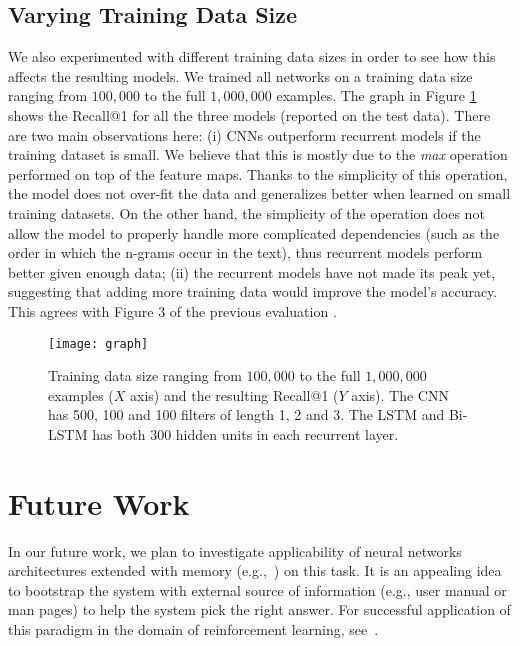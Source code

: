 \documentclass{article} \usepackage{nips15submit_e,times}
\newcommand{\MARTINSECOND}[1]{{\color{black}#1}} \newcommand{\MARTINTHIRD}[1]{{\color{black}#1}} \newcommand{\COPY}[1]{{\color{black}[#1]}}
\begin{document}
\subsection{Varying Training Data Size}
\MARTINSECOND{
We also experimented with different training data sizes in order to see how this affects the resulting models.
We trained all networks on a training data size ranging from $100,000$ to the full $1,000,000$ examples.
The graph in Figure \ref{fig-graph} shows the Recall@1 for all the three models (reported on the test data).
There are two main observations here: 
(i) CNNs outperform recurrent models if the training dataset is small.
We believe that this is mostly due to the \textit{max} operation performed on top of the feature maps.
Thanks to the simplicity of this operation, the model does not over-fit the data and generalizes better when learned on small training datasets.
On the other hand, the simplicity of the operation does not allow the model to properly handle more complicated dependencies 
(such as the order in which the n-grams occur in the text), thus recurrent models perform better given enough data;
(ii) the recurrent models have not made its peak yet, suggesting that adding more training data would improve the model's accuracy.
This agrees with Figure 3 of the previous evaluation \cite{lowe2015ubuntu}.
}

\begin{figure}[h!]
  \centering
  \texttt{[image: graph]}
  \caption   
  {
  Training data size ranging from $100,000$ to the full $1,000,000$ examples ($X$ axis) and the resulting
  Recall@1 ($Y$ axis). The CNN has 500, 100 and 100 filters of length 1, 2 and 3. The LSTM and Bi-LSTM has both 300 hidden units in each recurrent layer.
  }
  \label{fig-graph}
\end{figure}








\section{Future Work}
In our future work, we plan to investigate applicability of neural networks architectures extended with memory (e.g.,~\cite{Graves2014,Sukhbaatar2015,Joulin2015}) on this task.
It is an appealing idea to bootstrap the system with external source of information (e.g., user manual or man pages)
to help the system pick the right answer. For successful application of this paradigm in the domain of reinforcement learning, see~\cite{Branavan2012}.
\end{document}
